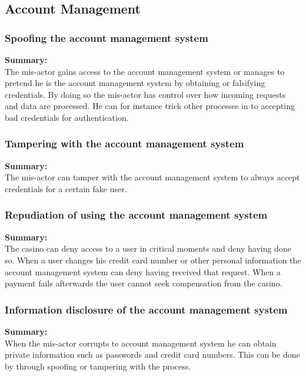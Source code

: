 \documentclass[a4paper,11pt]{report}
\begin{document}
\subsection{Account Management}
\label{AccountManagementCases}

\subsubsection{Spoofing the account management system}
\label{AccountManagementCasesS}
\textbf{Summary:} \\
The mis-actor gains access to the account management system or manages to pretend he is the account management system by obtaining or falsifying credentials. By doing so the mis-actor has control over how incoming requests and data are processed. He can for instance trick other processes in to accepting bad credentials for authentication.

\subsubsection{Tampering with the account management system}
\label{AccountManagementCasesT}
\textbf{Summary:} \\
The mis-actor can tamper with the account management system to always accept credentials for a certain fake user.

\subsubsection{Repudiation of using the account management system}
\label{AccountManagementCasesR}
\textbf{Summary:} \\
The casino can deny access to a user in critical moments and deny having done so. When a user changes his credit card number or other personal information the account management system can deny having received that request. When a payment fails afterwards the user cannot seek compensation from the casino.

\subsubsection{Information disclosure of the account management system}
\label{AccountManagementCasesI}
\textbf{Summary:} \\
When the mis-actor corrupts te account management system he can obtain private information such as passwords and credit card numbers. This can be done by through spoofing or tampering with the process.
\end{document}
